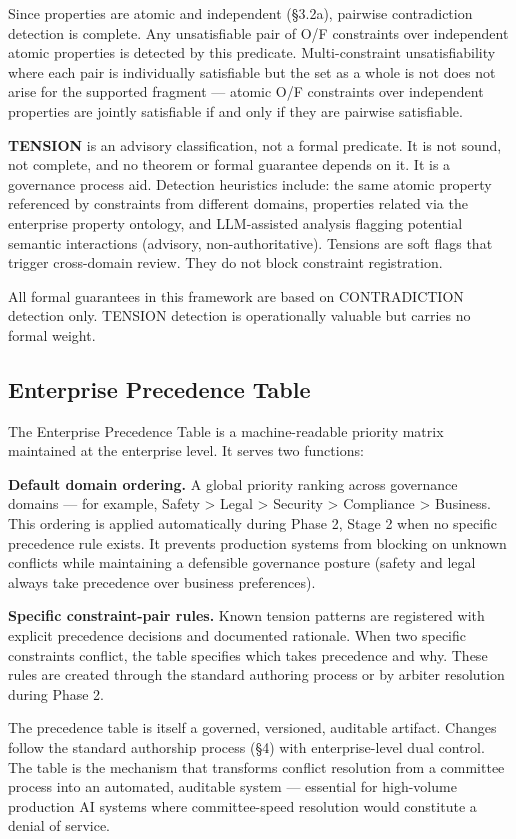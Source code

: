 Since properties are atomic and independent (\S{}3.2a), pairwise contradiction detection is complete. Any unsatisfiable pair of O/F constraints over independent atomic properties is detected by this predicate. Multi-constraint unsatisfiability where each pair is individually satisfiable but the set as a whole is not does not arise for the supported fragment --- atomic O/F constraints over independent properties are jointly satisfiable if and only if they are pairwise satisfiable.

\textbf{TENSION} is an advisory classification, not a formal predicate. It is not sound, not complete, and no theorem or formal guarantee depends on it. It is a governance process aid. Detection heuristics include: the same atomic property referenced by constraints from different domains, properties related via the enterprise property ontology, and LLM-assisted analysis flagging potential semantic interactions (advisory, non-authoritative). Tensions are soft flags that trigger cross-domain review. They do not block constraint registration.

All formal guarantees in this framework are based on CONTRADICTION detection only. TENSION detection is operationally valuable but carries no formal weight.

\subsection{Enterprise Precedence Table}


The Enterprise Precedence Table is a machine-readable priority matrix maintained at the enterprise level. It serves two functions:

\textbf{Default domain ordering.} A global priority ranking across governance domains --- for example, Safety > Legal > Security > Compliance > Business. This ordering is applied automatically during Phase 2, Stage 2 when no specific precedence rule exists. It prevents production systems from blocking on unknown conflicts while maintaining a defensible governance posture (safety and legal always take precedence over business preferences).

\textbf{Specific constraint-pair rules.} Known tension patterns are registered with explicit precedence decisions and documented rationale. When two specific constraints conflict, the table specifies which takes precedence and why. These rules are created through the standard authoring process or by arbiter resolution during Phase 2.

The precedence table is itself a governed, versioned, auditable artifact. Changes follow the standard authorship process (\S{}4) with enterprise-level dual control. The table is the mechanism that transforms conflict resolution from a committee process into an automated, auditable system --- essential for high-volume production AI systems where committee-speed resolution would constitute a denial of service.



